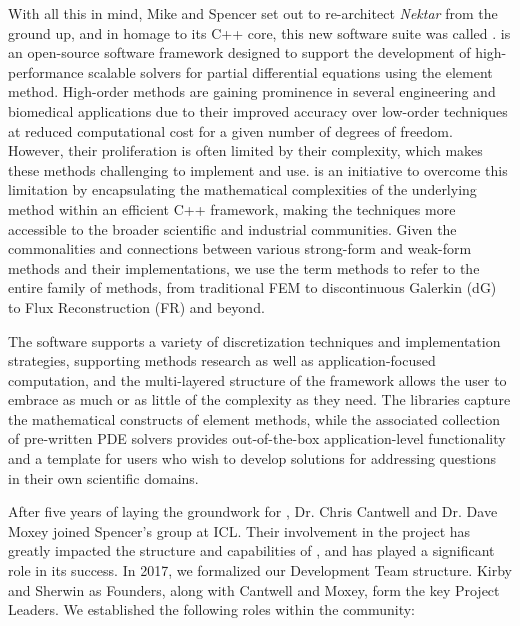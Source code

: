 With all this in mind, Mike and Spencer set out to re-architect \emph{Nektar} from the ground up, and in homage
to its C++ core, this new software suite was called \nek{}.  \nek{} 
is an open-source software framework designed to support the development
of high-performance scalable solvers for partial differential equations using
the \shp{} element method. High-order methods are gaining prominence in
several engineering and biomedical applications due to their improved accuracy
over low-order techniques at reduced computational cost for a given number of degrees of freedom. However,
their proliferation is often limited by their complexity, which makes
these methods challenging to implement and use. \nek{} is an initiative to
overcome this limitation by encapsulating the mathematical complexities of the underlying method within an
efficient C++ framework, making the techniques more accessible to the broader 
scientific and industrial communities.  Given the commonalities and connections between various strong-form
and weak-form methods and their implementations, we use the term \shp methods to refer to the entire family of
methods, from traditional FEM to discontinuous Galerkin (dG) to Flux Reconstruction (FR) and beyond.

The software supports a variety of discretization techniques and implementation
strategies, supporting methods research as well as application-focused
computation, and the multi-layered structure of the framework allows the user to
embrace as much or as little of the complexity as they need. The
libraries capture the mathematical constructs of \shp{} element methods,
while the associated collection of pre-written PDE solvers provides
out-of-the-box application-level functionality and a template for users who wish to develop
solutions for addressing questions in their own scientific domains.

After five years of laying the groundwork for \nek{}, Dr. Chris Cantwell and Dr. Dave Moxey joined
Spencer's group at ICL.  Their involvement in the project has greatly impacted the structure and
capabilities of \nek{}, and has played a significant role in its success.  In 2017, we formalized
our Development Team structure.  Kirby and Sherwin as Founders, along with Cantwell and Moxey,
form the key Project Leaders. We established the following roles within the \nek{} community:

